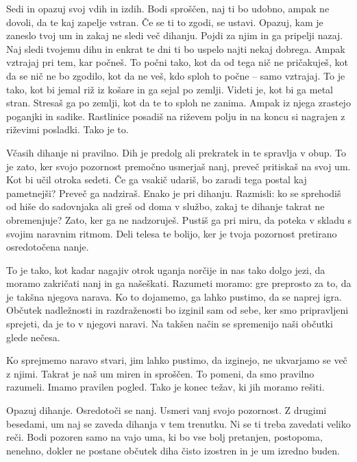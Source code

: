 Sedi in opazuj svoj vdih in izdih. Bodi sproščen, naj ti bo udobno, ampak ne dovoli, da te kaj zapelje vstran. Če se ti to zgodi, se ustavi. Opazuj, kam je zaneslo tvoj um in zakaj ne sledi več dihanju. Pojdi za njim in ga pripelji nazaj. Naj sledi tvojemu dihu in enkrat te dni ti bo uspelo najti nekaj dobrega. Ampak vztrajaj pri tem, kar počneš. To počni tako, kot da od tega nič ne pričakuješ, kot da se nič ne bo zgodilo, kot da ne veš, kdo sploh to počne – samo vztrajaj. To je tako, kot bi jemal riž iz košare in ga sejal po zemlji. Videti je, kot bi ga metal stran. Stresaš ga po zemlji, kot da te to sploh ne zanima. Ampak iz njega zrastejo poganjki in sadike. Rastlinice posadiš na riževem polju in na koncu si nagrajen z riževimi posladki. Tako je to.

\clearpage

\enlargethispage{2\baselineskip}


Včasih dihanje ni pravilno. Dih je predolg ali prekratek in te spravlja v obup. To je zato, ker svojo pozornost premočno usmerjaš nanj, preveč pritiskaš na svoj um. Kot bi učil otroka sedeti. Če ga vsakič udariš, bo zaradi tega postal kaj pametnejši? Preveč ga nadziraš. Enako je pri dihanju. Razmisli: ko se sprehodiš od hiše do sadovnjaka ali greš od doma v službo, zakaj te dihanje takrat ne obremenjuje? Zato, ker ga ne nadzoruješ. Pustiš ga pri miru, da poteka v skladu s svojim naravnim ritmom. Deli telesa te bolijo, ker je tvoja pozornost pretirano osredotočena nanje.

\vspace{-2\baselineskip}

To je tako, kot kadar nagajiv otrok uganja norčije in nas tako dolgo jezi, da moramo zakričati nanj in ga našeškati. Razumeti moramo: gre preprosto za to, da je takšna njegova narava. Ko to dojamemo, ga lahko pustimo, da se naprej igra. Občutek nadležnosti in razdraženosti bo izginil sam od sebe, ker smo pripravljeni sprejeti, da je to v njegovi naravi. Na takšen način se spremenijo naši občutki glede nečesa.

Ko sprejmemo naravo stvari, jim lahko pustimo, da izginejo, ne ukvarjamo se več z njimi. Takrat je naš um miren in sproščen. To pomeni, da smo pravilno razumeli. Imamo pravilen pogled. Tako je konec težav, ki jih moramo rešiti.

\clearpage


Opazuj dihanje. Osredotoči se nanj. Usmeri vanj svojo pozornost. Z drugimi besedami, um naj se zaveda dihanja v tem trenutku. Ni se ti treba zavedati veliko reči. Bodi pozoren samo na vajo uma, ki bo vse bolj pretanjen, postopoma, nenehno, dokler ne postane občutek diha čisto izostren in je um izredno buden.

